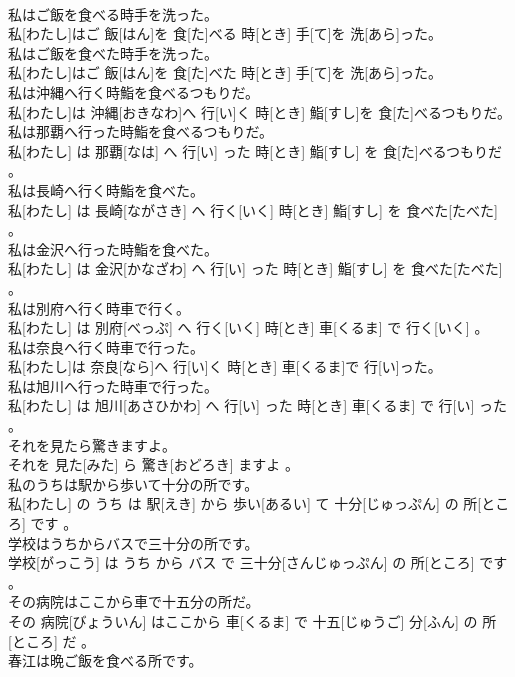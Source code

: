 \documentclass[8pt]{extreport}
\begin{document}
\begin{CJK}{UTF8}{min}
\\	私はご飯を食べる時手を洗った。	
\\	私[わたし]はご 飯[はん]を 食[た]べる 時[とき] 手[て]を 洗[あら]った。
\\	私はご飯を食べた時手を洗った。	
\\	私[わたし]はご 飯[はん]を 食[た]べた 時[とき] 手[て]を 洗[あら]った。
\\	私は沖縄へ行く時鮨を食べるつもりだ。	
\\	私[わたし]は 沖縄[おきなわ]へ 行[い]く 時[とき] 鮨[すし]を 食[た]べるつもりだ。
\\	私は那覇へ行った時鮨を食べるつもりだ。	
\\	私[わたし] は 那覇[なは] へ 行[い] った 時[とき] 鮨[すし] を 食[た]べるつもりだ 。
\\	私は長崎へ行く時鮨を食べた。	
\\	私[わたし] は 長崎[ながさき] へ 行く[いく] 時[とき] 鮨[すし] を 食べた[たべた] 。
\\	私は金沢へ行った時鮨を食べた。	
\\	私[わたし] は 金沢[かなざわ] へ 行[い] った 時[とき] 鮨[すし] を 食べた[たべた] 。
\\	私は別府へ行く時車で行く。	
\\	私[わたし] は 別府[べっぷ] へ 行く[いく] 時[とき] 車[くるま] で 行く[いく] 。
\\	私は奈良へ行く時車で行った。	
\\	私[わたし]は 奈良[なら]へ 行[い]く 時[とき] 車[くるま]で 行[い]った。
\\	私は旭川へ行った時車で行った。	
\\	私[わたし] は 旭川[あさひかわ] へ 行[い] った 時[とき] 車[くるま] で 行[い] った 。
\\	それを見たら驚きますよ。	
\\	それを 見た[みた] ら 驚き[おどろき] ますよ 。
\\	私のうちは駅から歩いて十分の所です。	
\\	私[わたし] の うち は 駅[えき] から 歩い[あるい] て 十分[じゅっぷん] の 所[ところ] です 。
\\	学校はうちからバスで三十分の所です。	
\\	学校[がっこう] は うち から バス で 三十分[さんじゅっぷん] の 所[ところ] です 。
\\	その病院はここから車で十五分の所だ。	
\\	その 病院[びょういん] はここから 車[くるま] で 十五[じゅうご] 分[ふん] の 所[ところ] だ 。
\\	春江は晩ご飯を食べる所です。	

\end{CJK}
\end{document}
